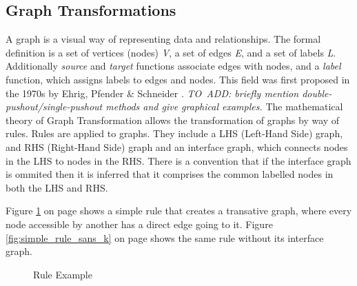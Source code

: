 \documentclass{UoYCSproject}
\begin{document}
\subsection{Graph Transformations}
A graph is a visual way of representing data and relationships. The formal definition is a set of vertices (nodes) \emph{V}, a set of edges \emph{E}, and a set of labels \emph{L}. Additionally \emph{source} and \emph{target} functions associate edges with nodes, and a \emph{label} function, which assigns labels to edges and nodes.
This field was first proposed in the 1970s by Ehrig, Pfender \& Schneider \cite{grat_origin}.
\emph{TO~ADD: briefly mention double-pushout/single-pushout methods and give graphical examples.} %
The mathematical theory of Graph Transformation allows the transformation of graphs by way of rules. Rules are applied to graphs. They include a LHS (Left-Hand Side) graph, and RHS (Right-Hand Side) graph and an interface graph, which connects nodes in the LHS to nodes in the RHS. There is a convention that if the interface graph is ommited then it is inferred that it comprises the common labelled nodes in both the LHS and RHS.

Figure \ref{fig:simple_rule} on page \pageref{fig:simple_rule} shows a simple rule that creates a transative graph, where every node accessible by another has a direct edge going to it. Figure \ref{fig:simple_rule_sans_k} on page \pageref{fig:simple_rule_sans_k} shows the same rule without its interface graph.

\begin{figure}
\label{fig:simple_rule}
\centering
{}
\caption{Rule Example}
\end{figure}
\end{document}
